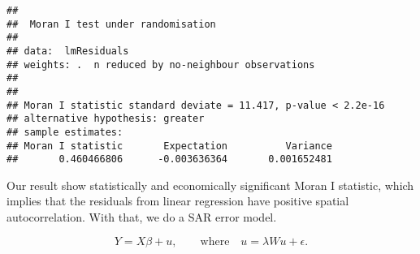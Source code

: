 \documentclass[
]{article}
\newenvironment{Shaded}{\begin{snugshade}}{\end{snugshade}}
\newcommand{\AttributeTok}[1]{\textcolor[rgb]{0.77,0.63,0.00}{#1}}
\newcommand{\CommentTok}[1]{\textcolor[rgb]{0.56,0.35,0.01}{\textit{#1}}}
\newcommand{\ConstantTok}[1]{\textcolor[rgb]{0.00,0.00,0.00}{#1}}
\newcommand{\DecValTok}[1]{\textcolor[rgb]{0.00,0.00,0.81}{#1}}
\newcommand{\FunctionTok}[1]{\textcolor[rgb]{0.00,0.00,0.00}{#1}}
\newcommand{\NormalTok}[1]{#1}
\newcommand{\OtherTok}[1]{\textcolor[rgb]{0.56,0.35,0.01}{#1}}
\newcommand{\SpecialCharTok}[1]{\textcolor[rgb]{0.00,0.00,0.00}{#1}}
\begin{document}
\begin{Shaded}
\end{Shaded}

\begin{verbatim}
## 
##  Moran I test under randomisation
## 
## data:  lmResiduals  
## weights: .  n reduced by no-neighbour observations
##   
## 
## Moran I statistic standard deviate = 11.417, p-value < 2.2e-16
## alternative hypothesis: greater
## sample estimates:
## Moran I statistic       Expectation          Variance 
##       0.460466806      -0.003636364       0.001652481
\end{verbatim}

Our result show statistically and economically significant Moran I
statistic, which implies that the residuals from linear regression have
positive spatial autocorrelation. With that, we do a SAR error model.

\[Y = X\beta + u, \qquad \text{where} \quad u = \lambda Wu + \epsilon.\]
\end{document}
